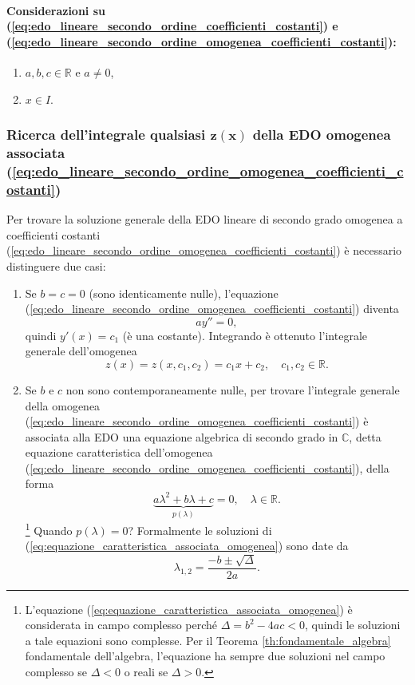\paragraph{Considerazioni su (\ref{eq:edo_lineare_secondo_ordine_coefficienti_costanti}) e (\ref{eq:edo_lineare_secondo_ordine_omogenea_coefficienti_costanti}):}
\begin{enumerate}
	\item $a,b,c \in\mathbb{R}$ e $a\neq 0$,
	\item $x\in I$.
\end{enumerate}

\subsubsection{Ricerca dell'integrale qualsiasi \texorpdfstring{$\boldsymbol{z(x)}$}{z(x)} della EDO omogenea associata (\ref{eq:edo_lineare_secondo_ordine_omogenea_coefficienti_costanti})}
Per trovare la soluzione generale della EDO lineare di secondo grado omogenea a coefficienti costanti (\ref{eq:edo_lineare_secondo_ordine_omogenea_coefficienti_costanti}) è necessario distinguere due casi:
\begin{enumerate}
	\item Se $b=c=0$ (sono identicamente nulle), l'equazione (\ref{eq:edo_lineare_secondo_ordine_omogenea_coefficienti_costanti}) diventa
	\begin{equation*}
		a y''=0,
	\end{equation*}
	quindi $y'(x)=c_1$ (è una costante). Integrando è ottenuto l'integrale generale dell'omogenea
	\begin{equation*}
		z(x)=z(x,c_1,c_2) 
		= c_1 x+c_2,\quad c_1,c_2\in\mathbb{R}.
	\end{equation*}
	\item Se $b$ e $c$ non sono contemporaneamente nulle, per trovare l'integrale generale della omogenea (\ref{eq:edo_lineare_secondo_ordine_omogenea_coefficienti_costanti}) è associata alla EDO una equazione algebrica di secondo grado in $\mathbb{C}$, detta equazione caratteristica dell'omogenea (\ref{eq:edo_lineare_secondo_ordine_omogenea_coefficienti_costanti}), della forma
	\begin{equation}\label{eq:equazione_caratteristica_associata_omogenea}
		\underbrace{a\lambda^2 + b\lambda + c}_{p(\lambda)} = 0,\quad\lambda\in\mathbb{R}.
	\end{equation}
	\footnote{L'equazione (\ref{eq:equazione_caratteristica_associata_omogenea}) è considerata in campo complesso perché $\Delta = b^2-4ac<0$, quindi le soluzioni a tale equazioni sono complesse. Per il Teorema \ref{th:fondamentale_algebra} fondamentale dell'algebra, l'equazione ha sempre due soluzioni nel campo complesso se $\Delta<0$ o reali se $\Delta>0$.} Quando $p(\lambda)=0$? Formalmente le soluzioni di (\ref{eq:equazione_caratteristica_associata_omogenea}) sono date da
	\begin{equation*}
		\lambda_{1,2} = \frac{-b\pm\sqrt{\Delta}}{2a}.
	\end{equation*}
\end{enumerate}

